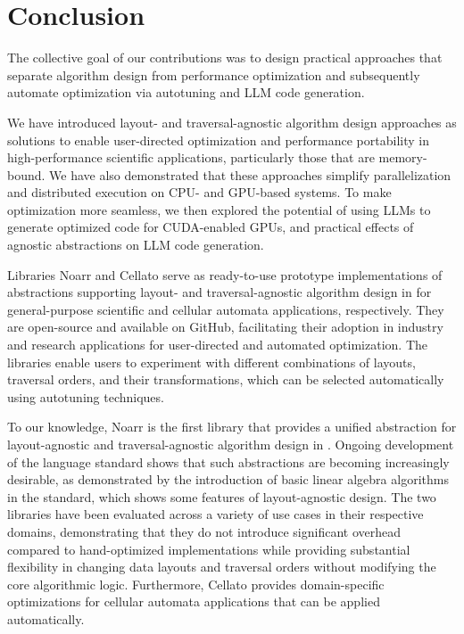 \chapter{Conclusion}\label{chap:conclusion}

The collective goal of our contributions was to design practical approaches that separate algorithm design from performance optimization and subsequently automate optimization via autotuning and LLM code generation.

We have introduced layout- and traversal-agnostic algorithm design approaches as solutions to enable user-directed optimization and performance portability in high-performance scientific applications, particularly those that are memory-bound. We have also demonstrated that these approaches simplify parallelization and distributed execution on CPU- and GPU-based systems. To make optimization more seamless, we then explored the potential of using LLMs to generate optimized code for CUDA-enabled GPUs, and practical effects of agnostic abstractions on LLM code generation.

Libraries Noarr and Cellato serve as ready-to-use prototype implementations of abstractions supporting layout- and traversal-agnostic algorithm design in \cpp for general-purpose scientific and cellular automata applications, respectively. They are open-source and available on GitHub, facilitating their adoption in industry and research applications for user-directed and automated optimization. The libraries enable users to experiment with different combinations of layouts, traversal orders, and their transformations, which can be selected automatically using autotuning techniques.

To our knowledge, Noarr is the first library that provides a unified abstraction for layout-agnostic and traversal-agnostic algorithm design in \cpp. Ongoing development of the language standard shows that such abstractions are becoming increasingly desirable, as demonstrated by the introduction of basic linear algebra algorithms in the \cpptwentysix standard, which shows some features of layout-agnostic design. The two libraries have been evaluated across a variety of use cases in their respective domains, demonstrating that they do not introduce significant overhead compared to hand-optimized implementations while providing substantial flexibility in changing data layouts and traversal orders without modifying the core algorithmic logic. Furthermore, Cellato provides domain-specific optimizations for cellular automata applications that can be applied automatically.

